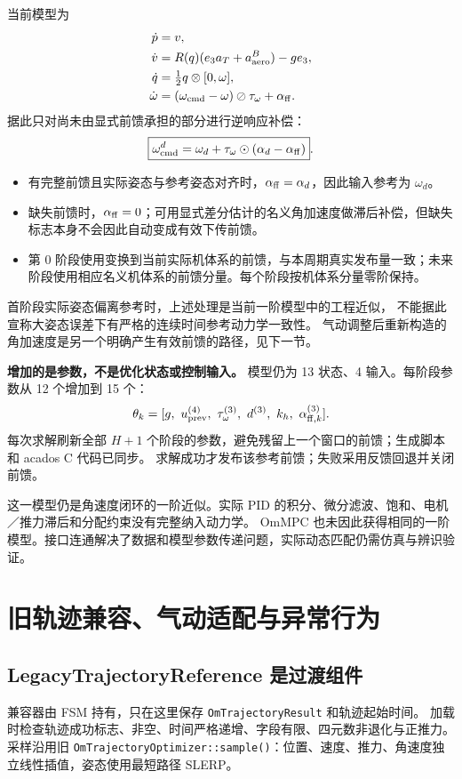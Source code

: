 \documentclass[UTF8,a4paper,11pt,fontset=fandol]{ctexart}
\newcommand{\code}[1]{{\small\nolinkurl{#1}}}
\newcommand{\note}[1]{\par\noindent\colorbox{panel}{\parbox{\dimexpr\linewidth-2\fboxsep}{#1}}\par}
\begin{document}
当前模型为
\begin{align}
 \dot p&=v,\\
 \dot v&=R(q)(e_3a_T+a_{\rm aero}^{B})-g e_3,\\
 \dot q&=\tfrac12q\otimes[0,\omega],\\
 \dot\omega&=(\omega_{\rm cmd}-\omega)\oslash\tau_\omega+\alpha_{\rm ff}.
\end{align}
据此只对尚未由显式前馈承担的部分进行逆响应补偿：
\begin{equation}
 \boxed{\omega_{\rm cmd}^d=\omega_d+
 \tau_\omega\odot(\alpha_d-\alpha_{\rm ff})}.
\end{equation}
\begin{itemize}
\item 有完整前馈且实际姿态与参考姿态对齐时，$\alpha_{\rm ff}=\alpha_d$，因此输入参考为 $\omega_d$。
\item 缺失前馈时，$\alpha_{\rm ff}=0$；可用显式差分估计的名义角加速度做滞后补偿，但缺失标志本身不会因此自动变成有效下传前馈。
\item 第 0 阶段使用变换到当前实际机体系的前馈，与本周期真实发布量一致；未来阶段使用相应名义机体系的前馈分量。每个阶段按机体系分量零阶保持。
\end{itemize}
首阶段实际姿态偏离参考时，上述处理是当前一阶模型中的工程近似，
不能据此宣称大姿态误差下有严格的连续时间参考动力学一致性。
气动调整后重新构造的角加速度是另一个明确产生有效前馈的路径，见下一节。

\textbf{增加的是参数，不是优化状态或控制输入。}
模型仍为 13 状态、4 输入。每阶段参数从 12 个增加到 15 个：
\begin{equation}
 \theta_k=[g,\ u_{\rm prev}^{(4)},\ \tau_\omega^{(3)},\ d^{(3)},\ k_h,
 \ \alpha_{{\rm ff},k}^{(3)}].
\end{equation}
每次求解刷新全部 $H+1$ 个阶段的参数，避免残留上一个窗口的前馈；生成脚本和 acados C 代码已同步。
求解成功才发布该参考前馈；失败采用反馈回退并关闭前馈。

\note{这一模型仍是角速度闭环的一阶近似。实际 PID 的积分、微分滤波、饱和、电机／推力滞后和分配约束没有完整纳入动力学。
OmMPC 也未因此获得相同的一阶模型。接口连通解决了数据和模型参数传递问题，实际动态匹配仍需仿真与辨识验证。}
\clearpage

\section{旧轨迹兼容、气动适配与异常行为}
\label{sec:limits}
\subsection{LegacyTrajectoryReference 是过渡组件}
兼容器由 FSM 持有，只在这里保存 \code{OmTrajectoryResult} 和轨迹起始时间。
加载时检查轨迹成功标志、非空、时间严格递增、字段有限、四元数非退化与正推力。
采样沿用旧 \code{OmTrajectoryOptimizer::sample()}：位置、速度、推力、角速度独立线性插值，姿态使用最短路径 SLERP。
\end{document}

